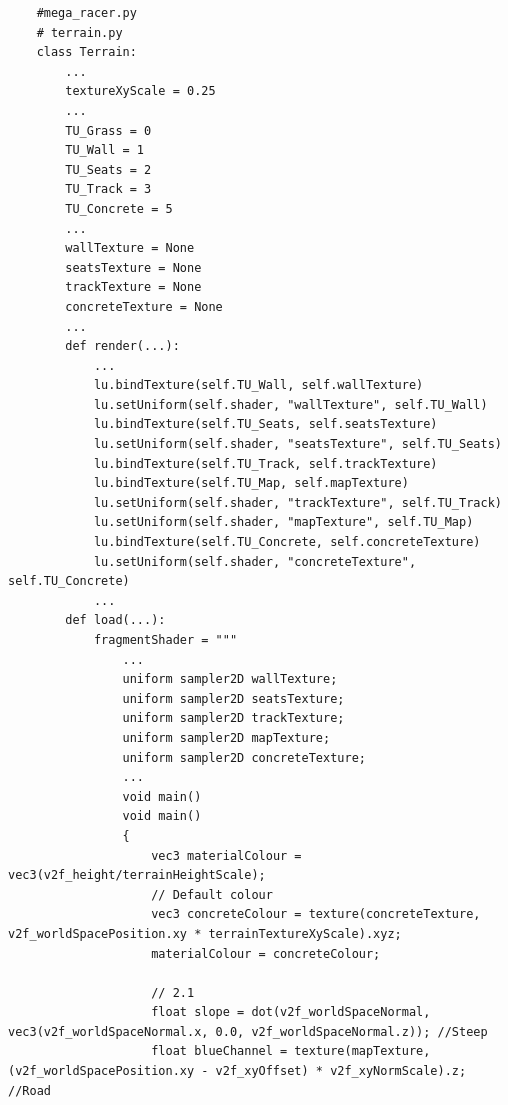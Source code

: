 \documentclass[a4 paper, 12pt]{article}
\begin{document}
\begin{lstlisting}
    #mega_racer.py    
    # terrain.py
    class Terrain:
        ...
        textureXyScale = 0.25
        ...
        TU_Grass = 0
        TU_Wall = 1
        TU_Seats = 2
        TU_Track = 3   
        TU_Concrete = 5
        ...
        wallTexture = None
        seatsTexture = None
        trackTexture = None    
        concreteTexture = None
        ...
        def render(...):
            ...
            lu.bindTexture(self.TU_Wall, self.wallTexture)
            lu.setUniform(self.shader, "wallTexture", self.TU_Wall)
            lu.bindTexture(self.TU_Seats, self.seatsTexture)
            lu.setUniform(self.shader, "seatsTexture", self.TU_Seats)
            lu.bindTexture(self.TU_Track, self.trackTexture)
            lu.bindTexture(self.TU_Map, self.mapTexture)
            lu.setUniform(self.shader, "trackTexture", self.TU_Track)
            lu.setUniform(self.shader, "mapTexture", self.TU_Map)
            lu.bindTexture(self.TU_Concrete, self.concreteTexture)
            lu.setUniform(self.shader, "concreteTexture", self.TU_Concrete)
            ...  
        def load(...):
            fragmentShader = """
                ...
                uniform sampler2D wallTexture;
                uniform sampler2D seatsTexture;   
                uniform sampler2D trackTexture;
                uniform sampler2D mapTexture;
                uniform sampler2D concreteTexture;
                ...  
                void main() 
                void main() 
                {
                    vec3 materialColour = vec3(v2f_height/terrainHeightScale);
                    // Default colour 
                    vec3 concreteColour = texture(concreteTexture, v2f_worldSpacePosition.xy * terrainTextureXyScale).xyz;
                    materialColour = concreteColour;
    
                    // 2.1                 
                    float slope = dot(v2f_worldSpaceNormal, vec3(v2f_worldSpaceNormal.x, 0.0, v2f_worldSpaceNormal.z)); //Steep 
                    float blueChannel = texture(mapTexture, (v2f_worldSpacePosition.xy - v2f_xyOffset) * v2f_xyNormScale).z; //Road
    

\end{lstlisting}
\end{document}
